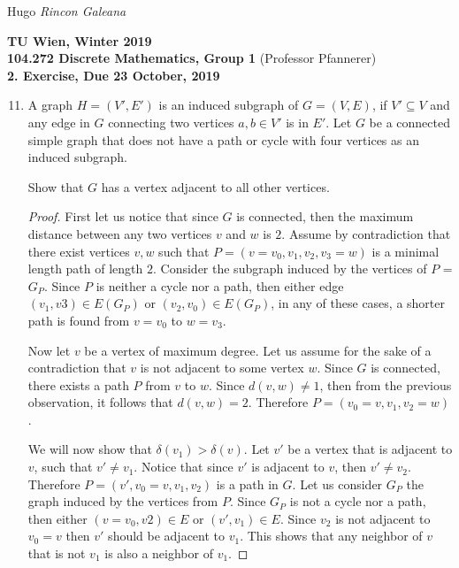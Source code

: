\documentclass[12pt]{article}
\newcommand{\Term}{Winter 2019}
\newcommand{\Course}{104.272 Discrete Mathematics, Group 1}
\newcommand{\Assignment}{2. Exercise}
\newcommand{\DueDate}{ 23 October, 2019 }
\begin{document}
Hugo \textit{Rincon Galeana}
\begin{center}

\textbf{TU Wien, \Term} \\
\textbf{\Course} (Professor Pfannerer) \\
\textbf{\Assignment, Due \DueDate}
\end{center}


\begin{enumerate}
    \setcounter{enumi}{10}
    \item A graph $H = (V',E')$ is an induced subgraph of $G=(V,E)$, if $V' \subseteq V$ and any edge in $G$ connecting two vertices $a,b \in V'$ is in $E'$. Let $G$ be a connected simple graph that does not have a path or cycle with four vertices as an induced subgraph.
    
    Show that $G$ has a vertex adjacent to all other vertices.
    
    \begin{proof}
        First let us notice that since $G$ is connected, then the maximum distance between any two vertices $v$ and $w$ is $2$. Assume by contradiction that there exist vertices $v,w$ such that $P=(v=v_0,v_1,v_2,v_3=w)$ is a minimal length path of length $2$.
        Consider the subgraph induced by the vertices of $P$ =$G_P$. Since $P$ is neither a cycle nor a path, then either edge $(v_1,v3) \in E(G_P)$ or $(v_2,v_0) \in E(G_P)$, in any of these cases, a shorter path is found from $v=v_0$ to $w=v_3$.
        
        Now let $v$ be a vertex of maximum degree. Let us assume for the sake of a contradiction that $v$ is not adjacent to some vertex $w$. Since $G$ is connected, there exists a path $P$ from $v$ to $w$. Since $d(v,w) \neq 1$, then from the previous observation, it follows that $d(v,w) = 2$. Therefore $P= (v_0 = v, v_1, v_2 = w)$. 
        
        We will now show that $\delta(v_1) > \delta (v)$. Let $v'$ be a vertex that is adjacent to $v$, such that $v' \neq v_1$. Notice that since $v'$ is adjacent to $v$, then $v' \neq v_2$. Therefore $P=(v',v_0 = v, v_1, v_2)$ is a path in $G$. Let us consider $G_P$ the graph induced by the vertices from $P$. Since $G_P$ is not a cycle nor a path, then either $(v=v_0,v2) \in E$ or $(v',v_1) \in E$. Since $v_2$ is not adjacent to $v_0=v$ then $v'$ should be adjacent to $v_1$. This shows that any neighbor of $v$ that is not $v_1$ is also a neighbor of $v_1$.
        

\end{proof}
\end{enumerate}
\end{document}
